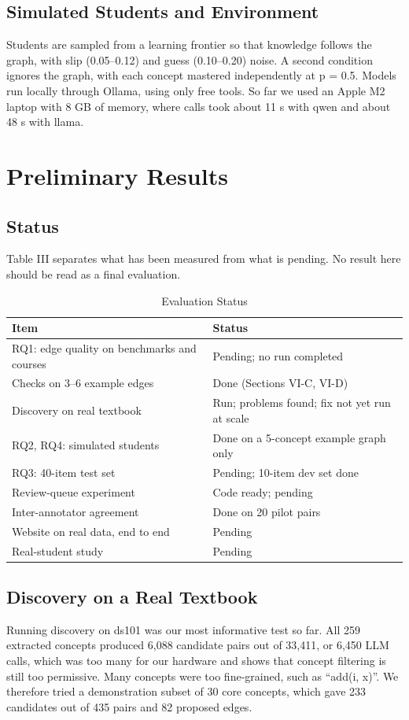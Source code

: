\documentclass[conference]{IEEEtran}
\begin{document}
\subsection{Simulated Students and Environment}
Students are sampled from a learning frontier so that knowledge follows the graph, with slip (0.05--0.12) and guess (0.10--0.20) noise. A second condition ignores the graph, with each concept mastered independently at p = 0.5. Models run locally through Ollama, using only free tools. So far we used an Apple M2 laptop with 8 GB of memory, where calls took about 11 s with qwen and about 48 s with llama.

\section{Preliminary Results}
\subsection{Status}
Table III separates what has been measured from what is pending. No result here should be read as a final evaluation.

\begin{table}[!t]
\caption{Evaluation Status}
\centering\footnotesize
\begin{tabular}{@{}p{}p{}@{}}
\toprule
\textbf{Item} & \textbf{Status} \\ \midrule
RQ1: edge quality on benchmarks and courses & Pending; no run completed \\
Checks on 3--6 example edges & Done (Sections VI-C, VI-D) \\
Discovery on real textbook & Run; problems found; fix not yet run at scale \\
RQ2, RQ4: simulated students & Done on a 5-concept example graph only \\
RQ3: 40-item test set & Pending; 10-item dev set done \\
Review-queue experiment & Code ready; pending \\
Inter-annotator agreement & Done on 20 pilot pairs \\
Website on real data, end to end & Pending \\
Real-student study & Pending \\
\bottomrule
\end{tabular}
\end{table}
\subsection{Discovery on a Real Textbook}
Running discovery on ds101 was our most informative test so far. All 259 extracted concepts produced 6,088 candidate pairs out of 33,411, or 6,450 LLM calls, which was too many for our hardware and shows that concept filtering is still too permissive. Many concepts were too fine-grained, such as ``add(i, x)''. We therefore tried a demonstration subset of 30 core concepts, which gave 233 candidates out of 435 pairs and 82 proposed edges.
\end{document}
